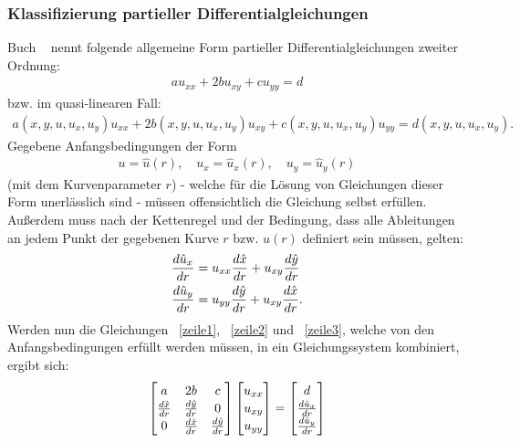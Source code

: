 \subsubsection{Klassifizierung partieller Differentialgleichungen}
Buch ~\cite[S. 115]{epstein_partial_2017} nennt folgende allgemeine Form partieller Differentialgleichungen zweiter Ordnung:
\begin{align}
\label{zeile1}
    a u_{xx} + 2b u_{xy} + c u_{yy} = d
\end{align}
bzw. im quasi-linearen Fall:
\begin{align*}
    a(x,y,u,u_x,u_y) u_{xx} + 2b(x,y,u,u_x,u_y) u_{xy} + c(x,y,u,u_x,u_y) u_{yy} = d(x,y,u,u_x,u_y).
\end{align*}
Gegebene Anfangsbedingungen der Form 
\begin{align*}
    u=\hat{u}(r), \quad u_x = \hat{u}_x (r), \quad u_y = \hat{u}_y (r)
\end{align*}
(mit dem Kurvenparameter $r$) - welche für die Lösung von Gleichungen dieser Form unerlässlich sind - müssen offensichtlich die Gleichung selbst erfüllen. Außerdem muss nach der Kettenregel und der Bedingung, dass alle Ableitungen an jedem Punkt der gegebenen Kurve $r$ bzw. $\hat{u}(r)$ definiert sein müssen, gelten:
\begin{align}
\label{zeile2}
    \frac{d \hat{u}_x}{d r} &= u_{xx} \frac{d \hat{x}}{d r} + u_{xy} \frac{d \hat{y}}{d r} \\ 
\label{zeile3}
    \frac{d \hat{u}_y}{d r} &= u_{yy} \frac{d \hat{y}}{d r} + u_{xy} \frac{d \hat{x}}{d r}.
\end{align}
Werden nun die Gleichungen ~\eqref{zeile1}, ~\eqref{zeile2} und ~\eqref{zeile3}, welche von den Anfangsbedingungen erfüllt werden müssen, in ein Gleichungssystem kombiniert, ergibt sich:
\begin{align}
\label{lgs_qual}
    \renewcommand{\arraystretch}{1.15}
    \begin{bmatrix}
        a & 2b & c \\
        \diff{\hat{x}}{r} & \diff{\hat{y}}{r} & 0 \\
        0 &  \diff{\hat{x}}{r} & \diff{\hat{y}}{r} \\
    \end{bmatrix}
    \begin{bmatrix}
        u_{xx} \\
        u_{xy} \\
        u_{yy} \\
    \end{bmatrix}
    =
    \begin{bmatrix}
        d \\
        \diff{\hat{u}_x}{r} \\
        \diff{\hat{u}_y}{r}
    \end{bmatrix}
\end{align}
